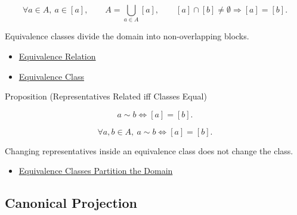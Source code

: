 \begin{remark*}
\[
\forall a\in A,\ a\in[a],
\qquad
A=\bigcup_{a\in A}[a],
\qquad
[a]\cap[b]\ne\emptyset \Longrightarrow [a]=[b].
\]
\end{remark*}

\begin{remark*}[Interpretation]
Equivalence classes divide the domain into non-overlapping blocks.
\end{remark*}

\begin{dependencies}
\begin{itemize}
  \item \hyperref[def:equivalence-relation]{Equivalence Relation}
  \item \hyperref[def:equivalence-class]{Equivalence Class}
\end{itemize}
\end{dependencies}

\begin{propositionbox}{Proposition (Representatives Related iff Classes Equal)}
\begin{proposition}
\label{prop:representatives-related-iff-classes-equal}
\[
a\sim b \Longleftrightarrow [a]=[b].
\]
\end{proposition}
\end{propositionbox}

\begin{remark*}
\[
\forall a,b\in A,\ a\sim b \Longleftrightarrow [a]=[b].
\]
\end{remark*}

\begin{remark*}[Interpretation]
Changing representatives inside an equivalence class does not change the
class.
\end{remark*}

\begin{dependencies}
\begin{itemize}
  \item \hyperref[thm:equivalence-classes-partition-domain]{Equivalence Classes Partition the Domain}
\end{itemize}
\end{dependencies}

\subsection*{Canonical Projection}

